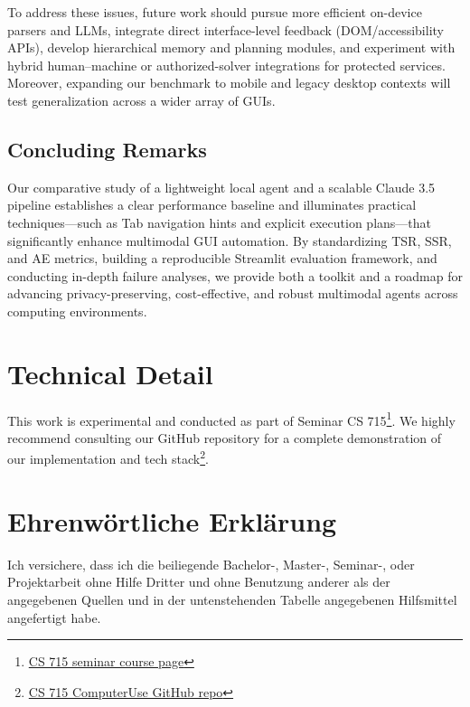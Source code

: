 \documentclass[runningheads]{llncs}
\begin{document}
To address these issues, future work should pursue more efficient on-device parsers and LLMs, integrate direct interface-level feedback (DOM/accessibility APIs), develop hierarchical memory and planning modules, and experiment with hybrid human–machine or authorized-solver integrations for protected services. Moreover, expanding our benchmark to mobile and legacy desktop contexts will test generalization across a wider array of GUIs.

\subsection{Concluding Remarks}
Our comparative study of a lightweight local agent and a scalable Claude 3.5 pipeline establishes a clear performance baseline and illuminates practical techniques—such as Tab navigation hints and explicit execution plans—that significantly enhance multimodal GUI automation. By standardizing TSR, SSR, and AE metrics, building a reproducible Streamlit evaluation framework, and conducting in-depth failure analyses, we provide both a toolkit and a roadmap for advancing privacy-preserving, cost-effective, and robust multimodal agents across computing environments.  


\section{Technical Detail}

This work is experimental and conducted as part of Seminar CS 715\footnote{\href{https://www.uni-mannheim.de/dws/teaching/course-details/courses-for-master-candidates/cs-715-seminar-on-solving-complex-tasks-using-large-language-models/}{CS 715 seminar course page}}. We highly recommend consulting our GitHub repository for a complete demonstration of our implementation and tech stack\footnote{\href{https://github.com/anhnhatcs/CS715_ComputerUse}{CS 715 ComputerUse GitHub repo}}.




\clearpage
\section*{Ehrenwörtliche Erklärung}
Ich versichere, dass ich die beiliegende Bachelor-, Master-, Seminar-, oder Projektarbeit ohne Hilfe Dritter und ohne Benutzung anderer als der angegebenen Quellen und in der untenstehenden Tabelle angegebenen Hilfsmittel angefertigt habe.
\end{document}
